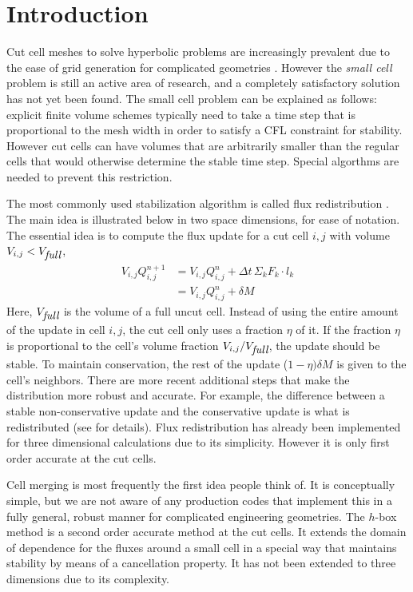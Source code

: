 \section{Introduction}\label{sec:intro}
Cut cell meshes to solve hyperbolic problems 
are increasingly prevalent due to the ease 
of grid generation for complicated geometries \cite{}. 
However the {\em small cell} problem is still an active area of research, and
a completely satisfactory solution has not yet been found.
The small cell problem can be explained as follows: explicit
finite volume schemes typically need to take a time step 
that is proportional to the mesh width in order to satisfy a CFL constraint for
stability. However cut cells can have volumes that are arbitrarily
smaller than the regular cells that would otherwise determine the stable time
step. Special algorthms are needed to prevent this restriction.

The most commonly used stabilization algorithm is called flux
redistribution \cite{chern:colella,vof:colella}. The main idea is illustrated below in two space
dimensions, for ease of notation.
The essential idea is to compute the 
flux update for a cut cell $i,j$ with volume $V_{i,j} < V_{\mbox{\em full}}$,
\begin{eqnarray*}
V_{i,j} Q_{i,j} ^{n+1} & = V_{i,j} Q_{i,j}^n  +  \Delta t \, \Sigma_k F_k \cdot l_{k}\\
                   & = V_{i,j} Q_{i,j}^n  +  \delta  M 
\end{eqnarray*}
Here, $V_{\mbox{\em full}}$ is the volume of a full uncut cell.
Instead of using the entire amount of the update in cell ${i,j}$, 
the cut cell only uses a fraction $\eta$ of it.  If the fraction $\eta$
is proportional to the cell's volume
fraction $V_{i,j}/V_{\mbox{\em full}}$, the update should be stable. 
To maintain conservation, the rest of the update ($1-\eta)\delta M$
is given to the cell's neighbors.  
There are more recent additional steps that make the distribution 
more robust and accurate. For example, the difference between a stable
non-conservative update and the conservative update is what is
redistributed (see \cite{} for details).
Flux redistribution has already been implemented for three dimensional
calculations due to its simplicity. However it is only first order
accurate at the cut cells.

Cell merging is most frequently the first idea people 
think of. It is conceptually simple, but 
we are not aware of any production codes that implement this in a fully
general, robust manner for complicated engineering geometries. 
The $h$-box method \cite{mjb-hel-rjl:hbox2,mjb-hel:hboxsimple}
is a second order accurate method at the cut cells. It extends the 
domain of dependence for the fluxes around a small cell in a 
special way that maintains stability by means of a cancellation
property. It  has not been extended to
three dimensions due to its complexity. 

